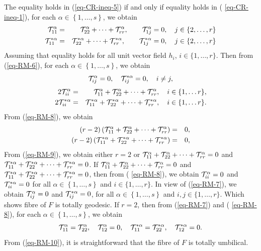 \documentclass[10pt,a4paper]{article}
\theoremstyle{definition}
\theoremstyle{remark}
\numberwithin{equation}{section}
\begin{document}
The equality holds in (\ref{eq-CR-ineq-5}) if and only if equality holds in (%
\ref{eq-CR-ineq-1}), for each $\alpha \in \left\{ 1,\ldots ,s\right\} $, we
obtain%
\begin{eqnarray}
{\cal T}_{11}^{\alpha } &=&{\cal T}_{22}^{\alpha }+\cdots +{\cal T}%
_{rr}^{\alpha },\quad \quad {\cal T}_{1j}^{\alpha }=0,\quad j\in \{2,\ldots
,r\}  \nonumber \\
{\cal T}_{11}^{\ast \alpha } &=&{\cal T}_{22}^{\ast \alpha }+\cdots +{\cal T}%
_{rr}^{\ast \alpha },\quad \quad {\cal T}_{1j}^{\ast \alpha }=0,\quad j\in
\{2,\ldots ,r\}  \label{eq-RM-6}
\end{eqnarray}%
Assuming that equality holds for all unit vector field $h_{i}$, $i\in
\{1,\ldots ,r\}$. Then from (\ref{eq-RM-6}), for each $\alpha \in \left\{
1,\ldots ,s\right\} $, we obtain%
\begin{equation}
{\cal T}_{ij}^{\alpha }=0,\quad {\cal T}_{ij}^{\ast \alpha }=0,\quad i\neq j,
\label{eq-RM-7}
\end{equation}%
\begin{eqnarray}
2{\cal T}_{ii}^{\alpha } &=&{\cal T}_{11}^{\alpha }+{\cal T}_{22}^{\alpha
}+\cdots +{\cal T}_{rr}^{\alpha },\quad i\in \{1,\ldots r\},  \nonumber \\
2{\cal T}_{ii}^{\ast \alpha } &=&{\cal T}_{11}^{\ast \alpha }+{\cal T}%
_{22}^{\ast \alpha }+\cdots +{\cal T}_{rr}^{\ast \alpha },\quad i\in
\{1,\ldots r\}.  \label{eq-RM-8}
\end{eqnarray}%
From (\ref{eq-RM-8}), we obtain%
\begin{eqnarray}
\left( r-2\right) ({\cal T}_{11}^{\alpha }+{\cal T}_{22}^{\alpha }+\cdots +%
{\cal T}_{rr}^{\alpha }) &=&0,  \nonumber \\
\left( r-2\right) ({\cal T}_{11}^{\ast \alpha }+{\cal T}_{22}^{\ast \alpha
}+\cdots +{\cal T}_{rr}^{\ast \alpha }) &=&0,  \label{eq-RM-9}
\end{eqnarray}%
From (\ref{eq-RM-9}), we obtain either $r=2$ or ${\cal T}_{11}^{\alpha }+%
{\cal T}_{22}^{\alpha }+\cdots +{\cal T}_{rr}^{\alpha }=0$ and ${\cal T}%
_{11}^{\ast \alpha }+{\cal T}_{22}^{\ast \alpha }+\cdots +{\cal T}%
_{rr}^{\ast \alpha }=0$. If ${\cal T}_{11}^{\alpha }+{\cal T}_{22}^{\alpha
}+\cdots +{\cal T}_{rr}^{\alpha }=0$ and ${\cal T}_{11}^{\ast \alpha }+{\cal %
T}_{22}^{\ast \alpha }+\cdots +{\cal T}_{rr}^{\ast \alpha }=0$, then from (%
\ref{eq-RM-8}), we obtain ${\cal T}_{ii}^{\alpha }=0$ and ${\cal T}%
_{ii}^{\ast \alpha }=0$ for all $\alpha \in \left\{ 1,\ldots ,s\right\} $
and $i\in \{1,\ldots ,r\}$. In view of (\ref{eq-RM-7}), we obtain ${\cal T}%
_{ij}^{\alpha }=0$ and ${\cal T}_{ij}^{\ast \alpha }=0$, for all $\alpha \in
\left\{ 1,\ldots ,s\right\} $ and $i,j\in \{1,\ldots ,r\}$. Which shows
fibre of $F$ is totally geodesic. If $r=2$, then from (\ref{eq-RM-7}) and (%
\ref{eq-RM-8}), for each $\alpha \in \left\{ 1,\ldots ,s\right\} $, we
obtain 
\begin{equation}
{\cal T}_{11}^{\alpha }={\cal T}_{22}^{\alpha },\quad {\cal T}_{12}^{\alpha
}=0,\quad {\cal T}_{11}^{\ast \alpha }={\cal T}_{22}^{\ast \alpha },\quad 
{\cal T}_{12}^{\ast \alpha }=0.  \label{eq-RM-10}
\end{equation}%
From (\ref{eq-RM-10}), it is straightforward that the fibre of $F$ is
totally umbilical.
\end{document}
